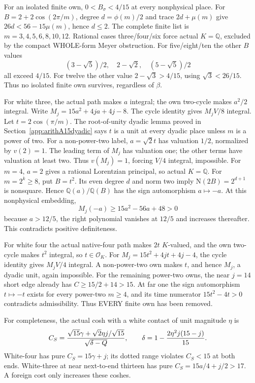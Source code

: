 For an isolated finite own,
\(0<B_\sigma<4/15\) at every nonphysical place.
For \(B=2+2\cos(2\pi/m)\), degree \(d=\phi(m)/2\)
and trace \(2d+\mu(m)\) give
\(26d<56-15\mu(m)\), hence \(d\le2\).
The complete finite list is \(m=3,4,5,6,8,10,12\).
Rational cases three/four/six force actual \(K=\mathbb Q\),
excluded by the compact WHOLE-form Meyer obstruction.
For five/eight/ten the other \(B\) values
\[
 (3-\sqrt5)/2,\quad2-\sqrt2,\quad(5-\sqrt5)/2
\]
all exceed \(4/15\).
For twelve the other value \(2-\sqrt3>4/15\),
using \(\sqrt3<26/15\).
Thus no isolated finite own survives, regardless of \(\beta\).

For white three, the actual path makes \(a\) integral;
the own two-cycle makes \(a^2/2\) integral.
Write \(M_j=15a^2+4ja+4j-8\).
The cycle identity gives \(M_jV/8\) integral.
Let \(t=2\cos(\pi/m)\).
The root-of-unity dyadic lemma proved in
Section~\ref{app:arithA15dyadic} says \(t\) is a unit
at every dyadic place unless \(m\) is a power of two.
For a non-power-two label, \(a=\sqrt2t\) has
valuation \(1/2\), normalized by \(v(2)=1\).
The leading term of \(M_j\) has valuation one;
the other terms have valuation at least two.
Thus \(v(M_j)=1\), forcing \(V/4\) integral, impossible.
For \(m=4\), \(a=2\) gives a rational Lorentzian
principal, so actual \(K=\mathbb Q\).
For \(m=2^k\ge8\), put \(B=t^2\).
Its even degree \(d\) and norm two imply
\(\mathrm N(2B)=2^{d+1}\) is nonsquare.
Hence \(\mathbb Q(a)/\mathbb Q(B)\) has the sign
automorphism \(a\mapsto-a\).
At this nonphysical embedding,
\[
                  M_j(-a)\ge15a^2-56a+48>0
\]
because \(a>12/5\), the right polynomial vanishes
at \(12/5\) and increases thereafter.
This contradicts positive definiteness.

For white four the actual native-four path makes
\(2t\) \(K\)-valued, and the own two-cycle makes
\(t^2\) integral, so \(t\in\mathcal O_K\).
For \(M_j=15t^2+4jt+4j-4\), the cycle identity
gives \(M_jV/4\) integral.
A non-power-two own makes \(t\), and hence \(M_j\),
a dyadic unit, again impossible.
For the remaining power-two owns, the near \(j=14\)
short edge already has \(C\ge15/2+14>15\).
At far one the sign automorphism \(t\mapsto-t\)
exists for every power-two \(m\ge4\), and its time
numerator \(15t^2-4t>0\) contradicts admissibility.
Thus EVERY finite own has been removed.

For completeness, the actual cosh with a white contact
of unit magnitude \(\eta\) is
\[
 C_S={\sqrt{15}\gamma+\sqrt2\eta j/\sqrt{15}
                   \over\sqrt{\delta-Q}},\qquad
 \delta=1-{2\eta^2j(15-j)\over15}.
\]
White-four has pure \(C_S=15\gamma+j\);
its dotted range violates \(C_S<15\) at both ends.
White-three at near next-to-end thirteen has pure
\(C_S=15a/4+j/2>17\).
A foreign cost only increases these coshes.

